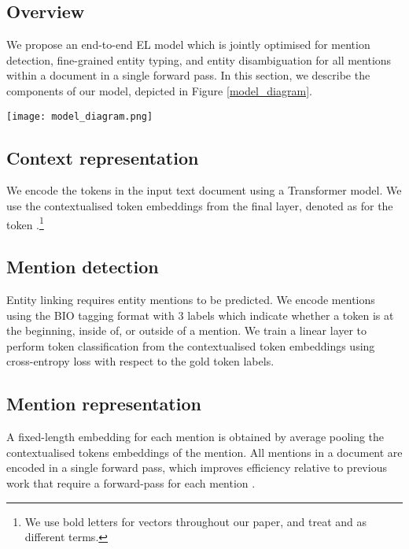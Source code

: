 \documentclass[11pt]{article}
\begin{document}
\subsection{Overview}
We propose an end-to-end EL model which is jointly optimised for mention detection, fine-grained entity typing, and entity disambiguation for all mentions within a document in a single forward pass. In this section, we describe the components of our model, depicted in Figure \ref{model_diagram}.

\begin{small}
\begin{figure*}[h]
	\centering
	\hspace{-25pt}
\texttt{[image: model\_diagram.png]}  \caption{Our model architecture shown for a document with two mentions, \textit{England} and \textit{FIFA World Cup}. The model performs mention detection, entity typing, and entity disambiguation for all mentions in a single pass.}
	\label{model_diagram}
\end{figure*}
\end{small}





\subsection{Context representation}
We encode the tokens  in the input text document using a Transformer model. We use the contextualised token embeddings from the final layer, denoted as  for the token .\footnote{We use bold letters for vectors throughout our paper, and treat  and  as different terms.}

\subsection{Mention detection}
Entity linking requires entity mentions to be predicted. We encode mentions using the BIO tagging format \citep{ramshaw-marcus-1995-text} with 3 labels which indicate whether a token is at the beginning, inside of, or outside of a mention. We train a linear layer to perform token classification from the contextualised token embeddings  using cross-entropy loss  with respect to the gold token labels.

\subsection{Mention representation}\label{mention representation}
A fixed-length embedding  for each mention  is obtained by average pooling the contextualised tokens embeddings of the mention. All mentions  in a document  are encoded in a single forward pass, which improves efficiency relative to previous work that require a forward-pass for each mention \cite{wu-etal-2020-scalable, Orr2021BootlegCT}.
\end{document}
